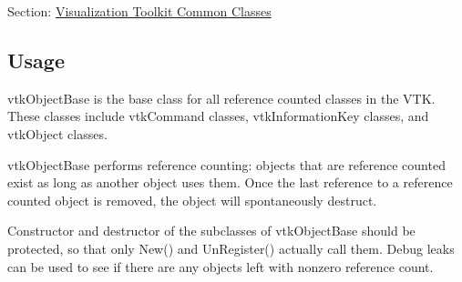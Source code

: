 Section\-: \hyperlink{sec_vtkcommon}{Visualization Toolkit Common Classes} \hypertarget{vtkwidgets_vtkxyplotwidget_Usage}{}\subsection{Usage}\label{vtkwidgets_vtkxyplotwidget_Usage}
vtk\-Object\-Base is the base class for all reference counted classes in the V\-T\-K. These classes include vtk\-Command classes, vtk\-Information\-Key classes, and vtk\-Object classes.

vtk\-Object\-Base performs reference counting\-: objects that are reference counted exist as long as another object uses them. Once the last reference to a reference counted object is removed, the object will spontaneously destruct.

Constructor and destructor of the subclasses of vtk\-Object\-Base should be protected, so that only New() and Un\-Register() actually call them. Debug leaks can be used to see if there are any objects left with nonzero reference count.

